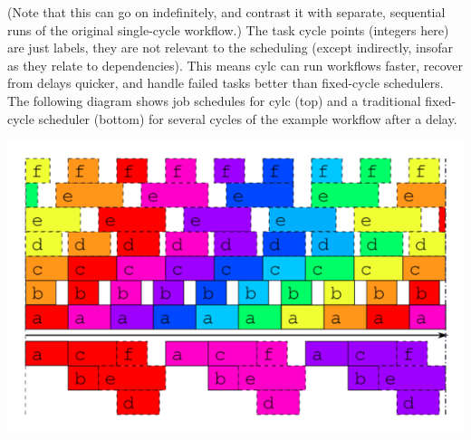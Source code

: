 (Note that this can go on indefinitely, and contrast it with separate,
sequential runs of the original single-cycle workflow.)  The task cycle points
(integers here) are just labels, they are not relevant to the scheduling
(except indirectly, insofar as they relate to dependencies). This means cylc
can run workflows faster, recover from delays quicker, and handle failed tasks
better than fixed-cycle schedulers.  The following diagram shows job schedules
for cylc (top) and a traditional fixed-cycle scheduler (bottom) for several
cycles of the example workflow after a delay.

\begin{center}
    \includegraphics[width=0.55\columnwidth]{resources/tex/timeline-two}
\end{center}
